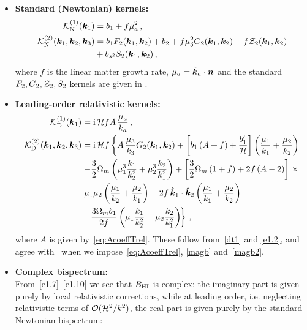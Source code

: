 \begin{itemize}
\item
{\bfseries Standard (Newtonian) kernels:}
\begin{align}
\mathcal{K}^{(1)}_\mathrm{N}(\bm {k}_1) &= b_1 + f\mu_{a}^{2}\,,  \label{e1.7} \\ 
\mathcal{K}^{(2)}_\mathrm{N}(\bm {k}_1,\bm {k}_2,\bm {k}_3) &= b_1 F_2(\bm {k}_1,\bm {k}_2) + b_2 + f\mu_{3}^{2} G_2(\bm {k}_1,\bm {k}_2) + f \mathcal{Z}_2(\bm {k}_1,\bm {k}_2) \nonumber \\
& + b_{s^{2}}S_{2}(\bm {k}_1,\bm {k}_2)\,, \label{e1.8}
\end{align}
where $f$ is the linear matter growth rate, $\mu_a=\hat{\bm {k}}_a\cdot\bm {n}$ and the standard $F_2,G_2,\mathcal{Z}_2,S_2$ kernels are given in \cite{Maartens:2019yhx}.

\item
{\bfseries Leading-order relativistic kernels:} 
\begin{align}
\mathcal{K}^{(1)}_{\mathrm{D}}(\bm {k}_1) &= \mathrm{i\,} \mathcal{H} f A\,\frac{\mu_{a}}{k_{a}}\,, \label{e1.9} \\
\mathcal{K}^{(2)}_{\mathrm{D}}(\bm {k}_1,\bm {k}_2,\bm {k}_3) &= \mathrm{i\,} \mathcal{H} f \left\{
A\,\frac{\mu_{3}}{k_{3}} G_{2}(\bm {k}_1,\bm {k}_2)
+{\left[ b_1\left( A+f \right) + \frac{b_1'}{\mathcal{H}} \right]}\left(\frac{\mu_{1}}{k_{1}} + \frac{\mu_{2}}{k_{2}}\right) \right.
\nonumber \\
& \left. -\frac{3}{2}\Omega_m \left(\mu_{1}^{3} \frac{k_{1}}{k_{2}^{2}} + \mu_{2}^{3}\frac{k_{2}}{k_{1}^{2}}\right)
+ \left[\frac{3}{2}\Omega_m \left(1+f \right)+2f\left(A-2\right) \right] \right. \times \\
& \left. \mu_{1}\mu_{2}\left(\frac{\mu_{1}}{k_{2}}+\frac{\mu_{2}}{k_{1}}\right) + 2 f \,  {\hat{\bm{k}}_{1} \cdot \hat{\bm{k}}_2}\left(\frac{\mu_{1}}{k_{1}} + \frac{\mu_{2}}{k_{2}}\right) \right. \nonumber \\
&\left. -\frac{3\Omega_m b_1}{2f} \left(\mu_{1}\frac{k_{1}}{k_{2}^{2}} + \mu_{2}\frac{k_{2}}{k_{1}^{2}}\right)\!  \right\}\,,\label{e1.10}
\end{align}
where $A$ is given by~\eqref{eq:AcoeffTrel}. These follow from~\eqref{dt1} and \eqref{e1.2}, and {agree with~\cite{Maartens:2019yhx} when we impose~\eqref{eq:AcoeffTrel}, \eqref{magb} and~\eqref{magb2}}.
\item
{\bfseries Complex bispectrum:}\\
From~\eqref{e1.7}--\eqref{e1.10} we see that
$B_{{\mathrm{HI}}}$ is complex: {the imaginary part is given purely by local relativistic corrections, while at leading order, i.e. neglecting relativistic terms of $\mathcal{O}(\mathcal{H}^2/k^2)$, the real part is given purely by the standard Newtonian bispectrum:}

\end{itemize}
